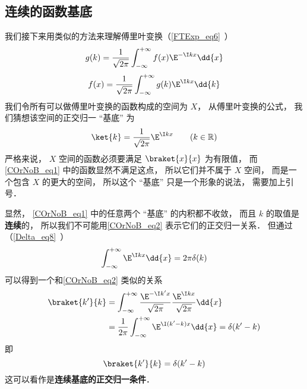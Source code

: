 \subsection{连续的函数基底}
我们接下来用类似的方法来理解傅里叶变换（\autoref{FTExp_eq6}~）
\begin{equation}\label{COrNoB_eq4}
g(k) = \frac{1}{\sqrt{2\pi }} \int_{-\infty }^{+\infty } f(x)\E^{-\I kx} \dd{x}
\end{equation}
\begin{equation}\label{COrNoB_eq3}
f(x) = \frac{1}{\sqrt{2\pi }} \int_{-\infty }^{+\infty } g(k)\E^{\I kx} \dd{k}
\end{equation}
我们令所有可以做傅里叶变换的函数构成的空间为 $X$， 从傅里叶变换的公式， 我们猜想该空间的正交归一 “基底” 为
\begin{equation}\label{COrNoB_eq1}
\ket{k} = \frac{1}{\sqrt{2\pi}} \E^{\I kx} \qquad (k \in \mathbb R)
\end{equation}
严格来说， $X$ 空间的函数必须要满足 $\braket{x}{x}$ 为有限值， 而\autoref{COrNoB_eq1} 中的函数显然不满足这点， 所以它们并不属于 $X$ 空间， 而是一个包含 $X$ 的更大的空间， 所以这个 “基底” 只是一个形象的说法， 需要加上引号．

显然， \autoref{COrNoB_eq1} 中的任意两个 “基底” 的内积都不收敛， 而且 $k$ 的取值是\textbf{连续}的， 所以我们不可能用\autoref{COrNoB_eq2} 表示它们的正交归一关系． 但通过（\autoref{Delta_eq8}~）
\begin{equation}
\int_{-\infty}^{+\infty} \E^{\I kx}\dd{x} = 2\pi \delta(k)
\end{equation}
可以得到一个和\autoref{COrNoB_eq2} 类似的关系
\begin{equation}
\begin{aligned}
\braket{k'}{k} &= \int_{-\infty}^{+\infty} \frac{\E^{-\I k'x}}{\sqrt{2\pi}} \frac{\E^{\I kx}}{\sqrt{2\pi}}\dd{x}\\
&= \frac{1}{2\pi}\int_{-\infty}^{+\infty} \E^{\I (k'-k)x}\dd{x}
= \delta(k' - k)
\end{aligned}
\end{equation}
即
\begin{equation}\label{COrNoB_eq8}
\braket{k'}{k} = \delta(k' - k)
\end{equation}
这可以看作是\textbf{连续基底的正交归一条件}．

